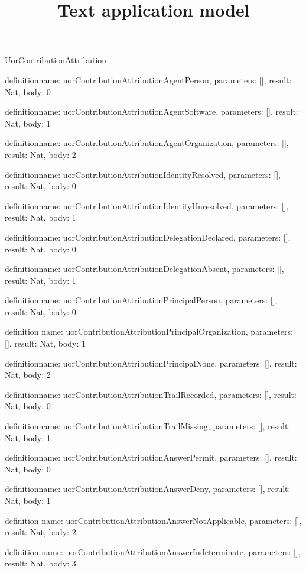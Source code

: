 \begin{lexlean}{UorContributionAttribution}
\title{Text application model}
\begin{semanticmodule}
definition{name: uorContributionAttributionAgentPerson, parameters: [], result: Nat, body: 0}

definition{name: uorContributionAttributionAgentSoftware, parameters: [], result: Nat, body: 1}

definition{name: uorContributionAttributionAgentOrganization, parameters: [], result: Nat, body: 2}

definition{name: uorContributionAttributionIdentityResolved, parameters: [], result: Nat, body: 0}

definition{name: uorContributionAttributionIdentityUnresolved, parameters: [], result: Nat, body: 1}

definition{name: uorContributionAttributionDelegationDeclared, parameters: [], result: Nat, body: 0}

definition{name: uorContributionAttributionDelegationAbsent, parameters: [], result: Nat, body: 1}

definition{name: uorContributionAttributionPrincipalPerson, parameters: [], result: Nat, body: 0}

definition{
  name: uorContributionAttributionPrincipalOrganization,
  parameters: [],
  result: Nat,
  body: 1
}

definition{name: uorContributionAttributionPrincipalNone, parameters: [], result: Nat, body: 2}

definition{name: uorContributionAttributionTrailRecorded, parameters: [], result: Nat, body: 0}

definition{name: uorContributionAttributionTrailMissing, parameters: [], result: Nat, body: 1}

definition{name: uorContributionAttributionAnswerPermit, parameters: [], result: Nat, body: 0}

definition{name: uorContributionAttributionAnswerDeny, parameters: [], result: Nat, body: 1}

definition{
  name: uorContributionAttributionAnswerNotApplicable,
  parameters: [],
  result: Nat,
  body: 2
}

definition{
  name: uorContributionAttributionAnswerIndeterminate,
  parameters: [],
  result: Nat,
  body: 3
}


\end{semanticmodule}
\end{lexlean}
